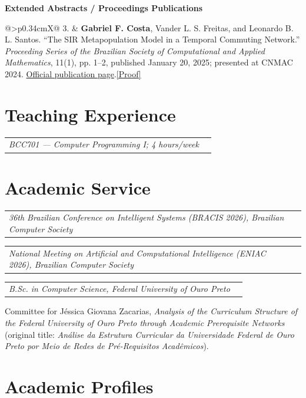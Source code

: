 \documentclass[10pt]{article}
\makeatletter
\newcommand{\doclink}[2]{\nobreak\hspace{0.22em}\href{#1}{{\footnotesize\color{accent}[#2]}}}
\newcommand{\TeachingURL}{https://drive.google.com/file/d/1K6EEeQAYRDLbVJaX6XibeydqOLttC0jq/view}
\newcommand{\CNMACProofURL}{https://drive.google.com/file/d/1bDbyCyxG6ZIvaxgg64419Brod2SAMfWs/view}
\newcommand{\ReviewerParticipationURL}{https://drive.google.com/file/d/1G_kPnmQDKeUwIZ1xL46MgxQXqlu5EMxw/view}
\newcommand{\ReviewerActivitiesURL}{https://drive.google.com/file/d/1H_bTVeI1Z9bBqoyFCSAZK9R9sz9DBWXL/view}
\newcommand{\BCCDeclarationURL}{https://drive.google.com/file/d/10JSGgSUkd1m99snP-U_Z9AyTF9s7wqYE/view}
\newcommand{\entry}[3]{%
  \needspace{2.5\baselineskip}%
  \begin{tabularx}{\linewidth}{@{}X>{\raggedleft\arraybackslash}p{2.35cm}@{}}
    \textbf{#1} & {\color{muted}\small #2}\\[-0.08em]
    \multicolumn{2}{@{}p{\linewidth}@{}}{{\itshape #3}}
  \end{tabularx}\par
}
\newcommand{\pub}[2]{%
  \needspace{3\baselineskip}%
  \noindent\begin{tabularx}{\linewidth}{@{}>{\bfseries\color{accent}}p{0.34cm}X@{}}
    #1 & #2
  \end{tabularx}\par
}
\makeatother
\begin{document}
\textbf{Extended Abstracts / Proceedings Publications}

\pub{3.}{\textbf{Gabriel F. Costa}, Vander L. S. Freitas, and Leonardo B. L. Santos. ``The SIR Metapopulation Model in a Temporal Commuting Network.'' \emph{Proceeding Series of the Brazilian Society of Computational and Applied Mathematics}, 11(1), pp. 1--2, published January 20, 2025; presented at CNMAC 2024. \href{https://proceedings.sbmac.org.br/sbmac/article/view/4856}{Official publication page}.\doclink{\CNMACProofURL}{Proof}}

\section{Teaching Experience}

\entry{Teaching Internship --- Federal University of Ouro Preto (UFOP)\doclink{\TeachingURL}{Proof}}{2025--2026}{BCC701 --- Computer Programming I; 4 hours/week}

\section{Academic Service}

\entry{Technical Program Committee Member and Reviewer\doclink{\ReviewerParticipationURL}{Participation}\doclink{\ReviewerActivitiesURL}{Reviews}}{2026}{36th Brazilian Conference on Intelligent Systems (BRACIS 2026), Brazilian Computer Society}

\entry{Technical Program Committee Member and Reviewer\doclink{\ReviewerParticipationURL}{Participation}\doclink{\ReviewerActivitiesURL}{Reviews}}{2026}{National Meeting on Artificial and Computational Intelligence (ENIAC 2026), Brazilian Computer Society}

\entry{Undergraduate Thesis Examination Committee Member\doclink{\BCCDeclarationURL}{Declaration}}{2026}{B.Sc. in Computer Science, Federal University of Ouro Preto}
Committee for Jéssica Giovana Zacarias, \emph{Analysis of the Curriculum Structure of the Federal University of Ouro Preto through Academic Prerequisite Networks} (original title: \emph{Análise da Estrutura Curricular da Universidade Federal de Ouro Preto por Meio de Redes de Pré-Requisitos Acadêmicos}).

\section{Academic Profiles}
\end{document}
